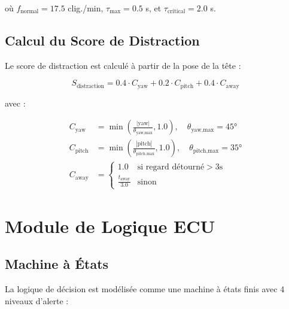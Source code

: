 où $f_{\text{normal}} = 17.5$ clig./min, $\tau_{\text{max}} = 0.5$ s, et $\tau_{\text{critical}} = 2.0$ s.

\subsection{Calcul du Score de Distraction}

Le score de distraction est calculé à partir de la pose de la tête :

\begin{equation}
\boxed{
S_{\text{distraction}} = 0.4 \cdot C_{\text{yaw}} + 0.2 \cdot C_{\text{pitch}} + 0.4 \cdot C_{\text{away}}
}
\label{eq:distraction_score}
\end{equation}

avec :

\begin{align}
C_{\text{yaw}} &= \min\left(\frac{|\text{yaw}|}{\theta_{\text{yaw,max}}}, 1.0\right), \quad \theta_{\text{yaw,max}} = 45° \label{eq:c_yaw} \\
C_{\text{pitch}} &= \min\left(\frac{|\text{pitch}|}{\theta_{\text{pitch,max}}}, 1.0\right), \quad \theta_{\text{pitch,max}} = 35° \label{eq:c_pitch} \\
C_{\text{away}} &= \begin{cases}
    1.0 & \text{si regard détourné} > 3\text{s} \\
    \frac{t_{\text{away}}}{3.0} & \text{sinon}
\end{cases} \label{eq:c_away}
\end{align}

\section{Module de Logique ECU}

\subsection{Machine à États}

La logique de décision est modélisée comme une machine à états finis avec 4 niveaux d'alerte :

